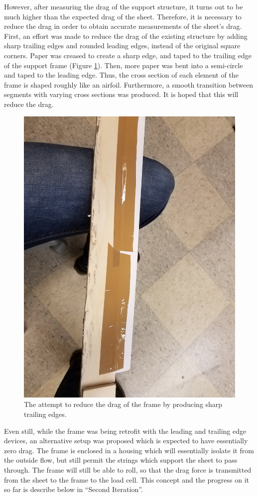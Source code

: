 \documentclass[12pt]{report} %
\begin{document}
However, after measuring the drag of the support structure, it turns out to be much higher than the expected drag of the sheet. Therefore,
it is necessary to reduce the drag in order to obtain accurate measurements of the sheet's drag. First, an effort was made to reduce the
drag of the existing structure by adding sharp trailing edges and rounded leading edges, instead of the original square corners. Paper was
creased to create a sharp edge, and taped to the trailing edge of the support frame (Figure \ref{sharp_edge}). Then, more paper was bent
into a semi-circle and taped to the leading edge. Thus, the cross section of each element of the frame is shaped roughly like an airfoil.
Furthermore, a smooth transition between segments with varying cross sections was produced. It is hoped that this will reduce the drag.

\begin{figure}
\includegraphics[width = 0.7\linewidth]{sharp_edge.jpg}
\centering
\caption{The attempt to reduce the drag of the frame by producing sharp trailing edges.}
\label{sharp_edge}
\end{figure}

Even still, while the frame was being retrofit with the leading and trailing edge devices, an alternative setup was proposed which is
expected to have essentially zero drag. The frame is enclosed in a housing which will essentially isolate it from the outside flow,
but still permit the strings which support the sheet to pass through. The frame will still be able to roll, so that the drag force
is transmitted from the sheet to the frame to the load cell. This concept and the progress on it so far is describe below in ``Second
Iteration''.
\end{document}
